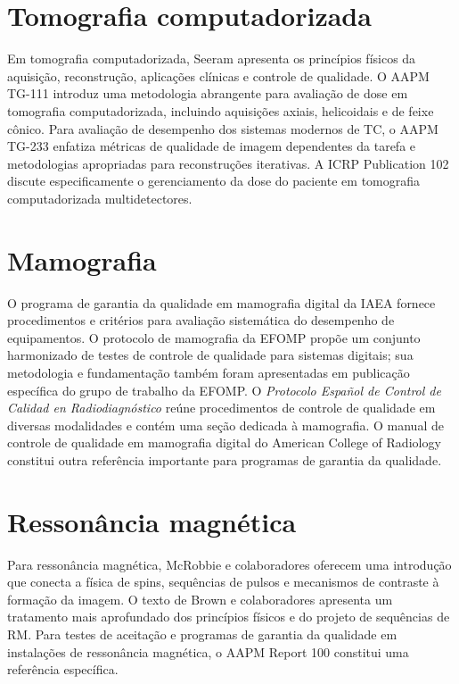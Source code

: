 \section{Tomografia computadorizada}

Em tomografia computadorizada, Seeram apresenta os princípios físicos da aquisição, reconstrução, aplicações clínicas e controle de qualidade\supercite{seeram2015}. O AAPM TG-111 introduz uma metodologia abrangente para avaliação de dose em tomografia computadorizada, incluindo aquisições axiais, helicoidais e de feixe cônico\supercite{aapm_tg111_2010}. Para avaliação de desempenho dos sistemas modernos de TC, o AAPM TG-233 enfatiza métricas de qualidade de imagem dependentes da tarefa e metodologias apropriadas para reconstruções iterativas\supercite{aapm_tg233_2019}. A ICRP Publication 102 discute especificamente o gerenciamento da dose do paciente em tomografia computadorizada multidetectores\supercite{icrp102_2007}.

\section{Mamografia}

O programa de garantia da qualidade em mamografia digital da IAEA fornece procedimentos e critérios para avaliação sistemática do desempenho de equipamentos\supercite{iaea_mammo2011}. O protocolo de mamografia da EFOMP propõe um conjunto harmonizado de testes de controle de qualidade para sistemas digitais\supercite{efomp_mammo2015}; sua metodologia e fundamentação também foram apresentadas em publicação específica do grupo de trabalho da EFOMP\supercite{gennaro2018}. O \emph{Protocolo Español de Control de Calidad en Radiodiagnóstico} reúne procedimentos de controle de qualidade em diversas modalidades e contém uma seção dedicada à mamografia\supercite{sefm_sepr_seram2011}. O manual de controle de qualidade em mamografia digital do American College of Radiology constitui outra referência importante para programas de garantia da qualidade\supercite{acr_mammo2018}.

\section{Ressonância magnética}

Para ressonância magnética, McRobbie e colaboradores oferecem uma introdução que conecta a física de spins, sequências de pulsos e mecanismos de contraste à formação da imagem\supercite{mcrobbie2017}. O texto de Brown e colaboradores apresenta um tratamento mais aprofundado dos princípios físicos e do projeto de sequências de RM\supercite{brown2014}. Para testes de aceitação e programas de garantia da qualidade em instalações de ressonância magnética, o AAPM Report 100 constitui uma referência específica\supercite{aapm100_2010}.


